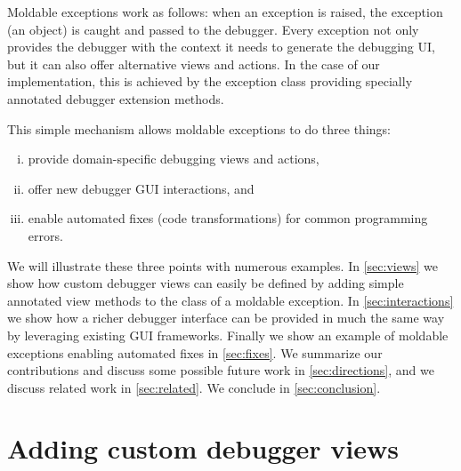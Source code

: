 \documentclass[sigplan,anonymous,review,10pt]{acmart}
\begin{document}
Moldable exceptions work as follows: when an exception is raised, the exception (an object) is caught and passed to the debugger.
Every exception not only provides the debugger with the context it needs to generate the debugging UI, but it can also offer alternative views and actions.
In the case of our implementation, this is achieved by the exception class providing specially annotated debugger extension methods.

This simple mechanism allows moldable exceptions to do three things:
\begin{enumerate}[(i)]
	\item provide domain-specific debugging views and actions,
	\item offer new debugger GUI interactions, and
	\item enable automated fixes (code transformations) for common programming errors.
\end{enumerate}

We will illustrate these three points with numerous examples.
In \autoref{sec:views} we show how custom debugger views can easily be defined by adding simple annotated view methods to the class of a moldable exception.
In \autoref{sec:interactions} we show how a richer debugger interface can be provided in much the same way by leveraging existing GUI frameworks.
Finally we show an example of moldable exceptions enabling automated fixes in \autoref{sec:fixes}.
We summarize our contributions and discuss some possible future work in \autoref{sec:directions}, and we discuss related work in \autoref{sec:related}.
We conclude in \autoref{sec:conclusion}.

\section{Adding custom debugger views}\label{sec:views}
\end{document}
